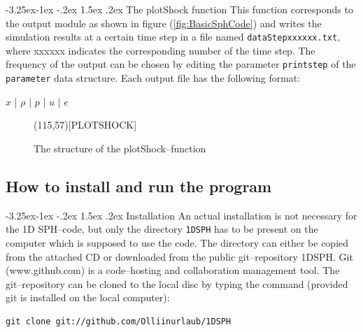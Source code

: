 \documentclass[11pt,a4paper,twoside]{report}
\makeatletter
\renewcommand\paragraph{\@startsection{paragraph}{4}{\z@}%
  {-3.25ex\@plus -1ex \@minus -.2ex}%
  {1.5ex \@plus .2ex}%
  {\normalfont\normalsize\bfseries}}
\makeatother
\begin{document}
\paragraph{The plotShock function}
This function corresponds to the output module as shown in figure  (\ref{fig:BasicSphCode}) and writes the simulation results at a certain time step in a file named {\tt dataStepxxxxxx.txt}, where xxxxxx indicates the corresponding number of the time step. The frequency of the output can be chosen by editing the parameter {\tt printstep} of the {\tt parameter} data structure. Each output file has the following format:

$x$ | $\rho$  |  $p$  |  $u$  |  $e$

\begin{figure}[H]
\label{fig:plotShock_structure}  

\begin{center}
\begin{struktogramm}(115,57)[PLOTSHOCK]
  \whileend
\end{struktogramm}
\end{center}

\caption{The structure of the plotShock--function}
\end{figure}

\subsection{How to install and run the program}
\paragraph{Installation}
An actual installation is not necessary for the 1D SPH--code, but only the directory {\tt 1DSPH} has to be present on the computer which is supposed to use the code. The directory can either be copied from the attached CD or downloaded from the public git--repository 1DSPH. Git (www.github.com) is a code--hosting and collaboration management tool. The git--repository can be cloned to the local disc by typing the command (provided git is installed on the local computer):
\begin{verbatim}
git clone git://github.com/Olliinurlaub/1DSPH
\end{verbatim}
\end{document}
